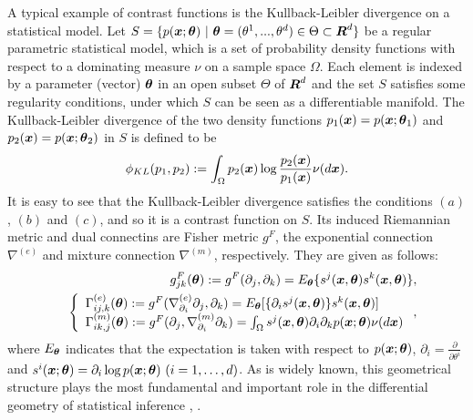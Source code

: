 \documentclass[graybox]{svmult}
\newcommand{\bm}[1]{\mbox{\boldmath $#1$}}
\newcommand{\bms}[1]{\mbox{\scriptsize\boldmath $#1$}}
\begin{document}
A typical example of contrast functions is the Kullback-Leibler divergence on a statistical model.
Let
$S=\{p(\bm{x};\bm{\theta}) \ | \ \bm{\theta}=(\theta^1,...,\theta^d) \in \Theta \subset \bm{R}^d\}$
be a regular parametric statistical model, which is a set of probability density functions with
respect to a dominating measure $\nu$ on a sample space $\Omega$. Each element is indexed by a
parameter (vector) $\bm{\theta}$ in an open subset $\Theta$ of $\bm{R}^d$ and the set $S$ satisfies
some regularity conditions, under which $S$ can be seen as a differentiable manifold. 
The Kullback-Leibler divergence of the two density functions $p_1(\bm{x})=p(\bm{x};\bm{\theta}_1)$
and $p_2(\bm{x})=p(\bm{x};\bm{\theta}_2)$ in $S$ is defined to be
%
\begin{eqnarray*}\label{KL}
\phi_{KL}(p_1,p_2) := \int_{\Omega}p_2(\bm{x})\log\frac{p_2(\bm{x})}{p_1(\bm{x})}\nu(d\bm{x}).
\end{eqnarray*}
%
It is easy to see that the Kullback-Leibler divergence satisfies the conditions $(a)$, $(b)$
and $(c)$, and so it is a contrast function on $S$. Its induced Riemannian metric and dual
connectins are Fisher metric $g^F$, the exponential connection $\nabla^{(e)}$ and mixture
connection $\nabla^{(m)}$, respectively. They are given as follows:
%
\begin{eqnarray*}
   &&g_{jk}^F(\bm{\theta}) := g^F(\partial_j,\partial_k)
                            = E_{\bms{\theta}}\{s^j(\bm{x},\bm{\theta})s^k(\bm{x},\bm{\theta})\},
                            \label{Fisher} \\
   &&\left\{\begin{array}{l}
               \Gamma_{ij,k}^{(e)}(\bm{\theta}) 
               := g^F(\nabla_{\partial_i}^{(e)}\partial_j,\partial_k)
                = E_{\bms{\theta}}[\{\partial_is^j(\bm{x},\bm{\theta})\}s^k(\bm{x},\bm{\theta})] \\
               \Gamma_{ik,j}^{(m)}(\bm{\theta})
               := g^F(\partial_j,\nabla_{\partial_i}^{(m)}\partial_k)
                = \int_{\Omega}s^j(\bm{x},\bm{\theta})\partial_i\partial_kp(\bm{x};\bm{\theta})
                  \nu(d\bm{x})
            \end{array}
     \right., \label{emconn}
\end{eqnarray*}
%
where $E_{\bms{\theta}}$ indicates that the expectation is taken with respect to
$p(\bm{x};\bm{\theta})$, $\partial_i=\frac{\partial}{\partial\theta^i}$ and
$s^{i}(\bm{x};\bm{\theta})=\partial_{i}\log p(\bm{x};\bm{\theta}) \ (i=1,\ldots,d)$.
As is widely known, this geometrical structure plays the most fundamental and important role
in the differential geometry of statistical inference \cite{AN}, \cite{A}.
\end{document}
